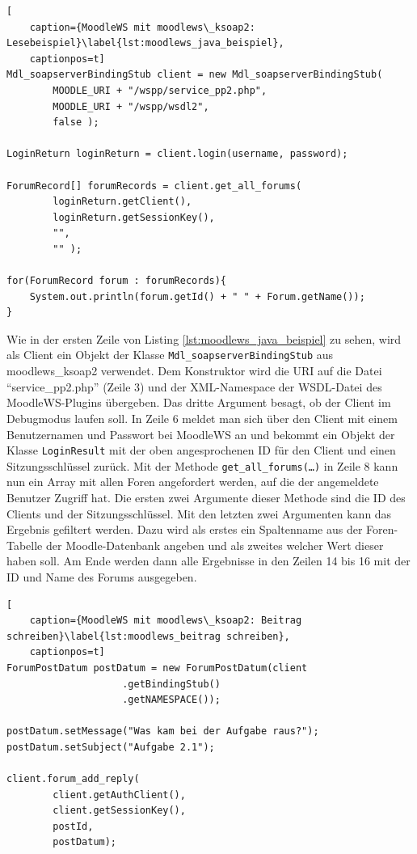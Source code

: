 \begin{lstlisting}[
    caption={MoodleWS mit moodlews\_ksoap2: Lesebeispiel}\label{lst:moodlews_java_beispiel},
    captionpos=t]
Mdl_soapserverBindingStub client = new Mdl_soapserverBindingStub(
        MOODLE_URI + "/wspp/service_pp2.php",
        MOODLE_URI + "/wspp/wsdl2",
        false );

LoginReturn loginReturn = client.login(username, password);

ForumRecord[] forumRecords = client.get_all_forums(
        loginReturn.getClient(),
        loginReturn.getSessionKey(),
        "",
        "" );

for(ForumRecord forum : forumRecords){
    System.out.println(forum.getId() + " " + Forum.getName());
}
\end{lstlisting}

Wie in der ersten Zeile von Listing \ref{lst:moodlews_java_beispiel} zu sehen, wird als Client ein Objekt der Klasse \texttt{Mdl\_soapserverBindingStub} aus moodlews\_ksoap2 verwendet. Dem Konstruktor wird die URI auf die Datei \enquote{service\_pp2.php} (Zeile 3) und der XML-Namespace der WSDL-Datei des MoodleWS-Plugins übergeben. Das dritte Argument besagt, ob der Client im Debugmodus laufen soll. In Zeile 6 meldet man sich über den Client mit einem Benutzernamen und Passwort bei MoodleWS an und bekommt ein Objekt der Klasse \texttt{LoginResult} mit der oben angesprochenen ID für den Client und einen Sitzungsschlüssel zurück. Mit der Methode \texttt{get\_all\_forums(\dots)} in Zeile 8 kann nun ein Array mit allen Foren angefordert werden, auf die der angemeldete Benutzer Zugriff hat. Die ersten zwei Argumente dieser Methode sind die ID des Clients und der Sitzungsschlüssel. Mit den letzten zwei Argumenten kann das Ergebnis gefiltert werden. Dazu wird als erstes ein Spaltenname aus der Foren-Tabelle der Moodle-Datenbank angeben und als zweites welcher Wert dieser haben soll. Am Ende werden dann alle Ergebnisse in den Zeilen 14 bis 16 mit der ID und Name des Forums ausgegeben.

\begin{lstlisting}[
    caption={MoodleWS mit moodlews\_ksoap2: Beitrag schreiben}\label{lst:moodlews_beitrag schreiben},
    captionpos=t]
ForumPostDatum postDatum = new ForumPostDatum(client
                    .getBindingStub()
                    .getNAMESPACE());

postDatum.setMessage("Was kam bei der Aufgabe raus?");
postDatum.setSubject("Aufgabe 2.1");

client.forum_add_reply(
        client.getAuthClient(),
        client.getSessionKey(),
        postId,
        postDatum);
\end{lstlisting}

